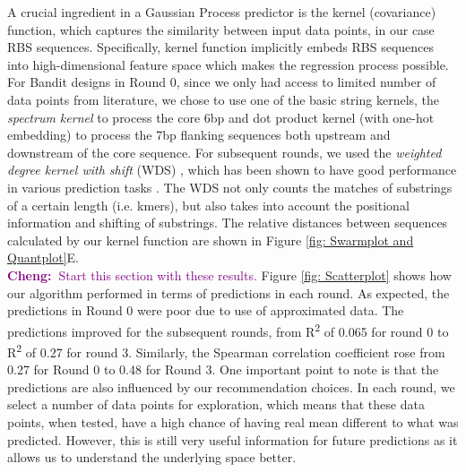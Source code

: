 \documentclass{article}
\newcommand{\cheng}[1]{\textcolor{purple}{{\bf Cheng:~}#1}}
\begin{document}
A crucial ingredient in a Gaussian Process predictor \cite{Rasmussen2004} is the kernel (covariance) function, which captures the similarity between input data points, in our case RBS sequences.
Specifically, kernel function implicitly embeds RBS sequences into high-dimensional feature space which makes the regression process possible.
For Bandit designs in Round 0, since we only had access to limited number of data points from literature, we chose to use one of the basic string kernels, the \textit{spectrum kernel} \cite{leslie2001spectrum} to process the core 6bp and dot product kernel \cite{Rasmussen2004} (with one-hot embedding) to process the 7bp flanking sequences both upstream and downstream of the core sequence.
For subsequent rounds, we used the \textit{weighted degree kernel with shift} (WDS) \cite{ratsch_rase_2005_wds}, which has been shown to have good performance in various prediction tasks \cite{Ben-Hur2008}.
The WDS not only counts the matches of substrings of a certain length (i.e. kmers), but also takes into account the positional information and shifting of substrings.
The relative distances between sequences calculated by our kernel function are shown in Figure \ref{fig: Swarmplot and Quantplot}E.\\

\cheng{Start this section with these results.}
Figure \ref{fig: Scatterplot} shows how our algorithm performed in terms of predictions in each round. 
As expected, the predictions in Round 0 were poor due to use of approximated data. 
The predictions improved for the subsequent rounds, from R\textsuperscript{2} of 0.065 for round 0 to R\textsuperscript{2} of 0.27 for round 3.
Similarly, the Spearman correlation coefficient rose from 0.27 for Round 0 to 0.48 for Round 3.
One important point to note is that the predictions are also influenced by our recommendation choices. 
In each round, we select a number of data points for exploration, which means that these data points, when tested, have a high chance of having real mean different to what was predicted.
However, this is still very useful information for future predictions as it allows us to understand the underlying space better.
    
\end{document}
